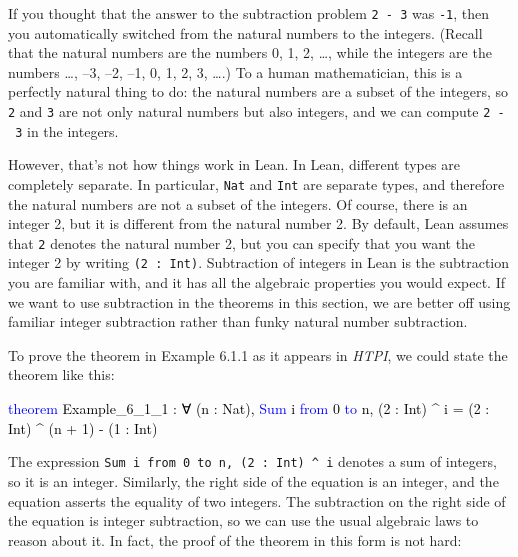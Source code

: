 \documentclass[
  letterpaper,
  DIV=11,
  numbers=noendperiod]{scrreprt}
\newenvironment{Shaded}{\begin{snugshade}}{\end{snugshade}}
\newcommand{\KeywordTok}[1]{\textcolor[rgb]{0.00,0.23,0.31}{#1}}
\newcommand{\NormalTok}[1]{\textcolor[rgb]{0.00,0.23,0.31}{#1}}
\renewcommand{\NormalTok}[1]{\textcolor[HTML]{000000}{#1}}
\renewcommand{\KeywordTok}[1]{\textcolor[HTML]{0000FF}{#1}}
\theoremstyle{remark}
\begin{document}
If you thought that the answer to the subtraction problem
\texttt{2\ -\ 3} was \texttt{-1}, then you automatically switched from
the natural numbers to the integers. (Recall that the natural numbers
are the numbers 0, 1, 2, \ldots, while the integers are the numbers
\ldots, --3, --2, --1, 0, 1, 2, 3, \ldots.) To a human mathematician,
this is a perfectly natural thing to do: the natural numbers are a
subset of the integers, so \texttt{2} and \texttt{3} are not only
natural numbers but also integers, and we can compute \texttt{2\ -\ 3}
in the integers.

However, that's not how things work in Lean. In Lean, different types
are completely separate. In particular, \texttt{Nat} and \texttt{Int}
are separate types, and therefore the natural numbers are not a subset
of the integers. Of course, there is an integer 2, but it is different
from the natural number 2. By default, Lean assumes that \texttt{2}
denotes the natural number 2, but you can specify that you want the
integer 2 by writing \texttt{(2\ :\ Int)}. Subtraction of integers in
Lean is the subtraction you are familiar with, and it has all the
algebraic properties you would expect. If we want to use subtraction in
the theorems in this section, we are better off using familiar integer
subtraction rather than funky natural number subtraction.

To prove the theorem in Example 6.1.1 as it appears in \emph{HTPI}, we
could state the theorem like this:

\begin{Shaded}
\begin{Highlighting}[]
\KeywordTok{theorem}\NormalTok{ Example\_6\_1\_1 :}
\NormalTok{    ∀ (n : Nat), }\KeywordTok{Sum}\NormalTok{ i }\KeywordTok{from}\NormalTok{ 0 }\KeywordTok{to}\NormalTok{ n, (2 : Int) \^{} i =}
\NormalTok{    (2 : Int) \^{} (n + 1) {-} (1 : Int)}
\end{Highlighting}
\end{Shaded}

The expression \texttt{Sum\ i\ from\ 0\ to\ n,\ (2\ :\ Int)\ \^{}\ i}
denotes a sum of integers, so it is an integer. Similarly, the right
side of the equation is an integer, and the equation asserts the
equality of two integers. The subtraction on the right side of the
equation is integer subtraction, so we can use the usual algebraic laws
to reason about it. In fact, the proof of the theorem in this form is
not hard:
\end{document}
